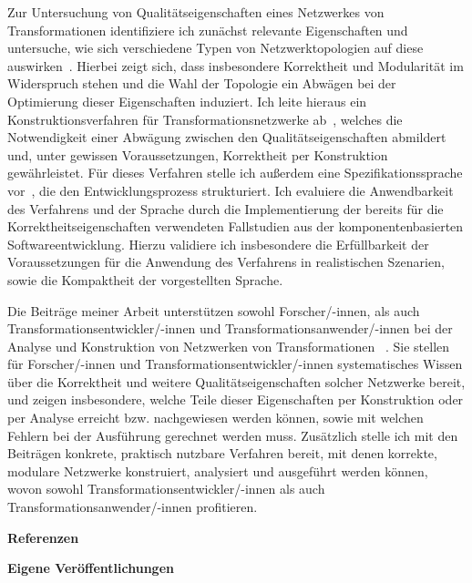 \documentclass[a4paper,deutsch,CS,11pt,unnummeriert]{KITbrief}
\newcommand\owncite[2][]{
    \cite[#1]{#2}
    \addtocategory{ownpublications}{#2}
}
\begin{document}
Zur Untersuchung von Qualitätseigenschaften eines Netzwerkes von Transformationen identifiziere ich zunächst relevante Eigenschaften und untersuche, wie sich verschiedene Typen von Netzwerktopologien auf diese auswirken~\cite{klare2018docsym}.
Hierbei zeigt sich, dass insbesondere Korrektheit und Modularität im Widerspruch stehen und die Wahl der Topologie ein Abwägen bei der Optimierung dieser Eigenschaften induziert.
Ich leite hieraus ein Konstruktionsverfahren für Transformationsnetzwerke ab~\cite{klare2019models}, welches die Notwendigkeit einer Abwägung zwischen den Qualitätseigenschaften abmildert und, unter gewissen Voraussetzungen, Korrektheit per Konstruktion gewährleistet. %
Für dieses Verfahren stelle ich außerdem eine Spezifikationssprache vor~\cite{klare2019models}, die den Entwicklungsprozess strukturiert.
Ich evaluiere die Anwendbarkeit des Verfahrens und der Sprache durch die Implementierung der bereits für die Korrektheitseigenschaften verwendeten Fallstudien aus der komponentenbasierten Softwareentwicklung. 
Hierzu validiere ich insbesondere die Erfüllbarkeit der Voraussetzungen für die Anwendung des Verfahrens in realistischen Szenarien, sowie die Kompaktheit der vorgestellten Sprache.

Die Beiträge meiner Arbeit unterstützen sowohl Forscher/-innen, als auch Transformationsentwickler/-innen und Transformationsanwender/-innen bei der Analyse und Konstruktion von Netzwerken von Transformationen~\owncite{klare2019dagstuhl}.
Sie stellen für Forscher/-innen und Transformationsentwickler/-innen systematisches Wissen über die Korrektheit und weitere Qualitätseigenschaften solcher Netzwerke bereit, und zeigen insbesondere, welche Teile dieser Eigenschaften per Konstruktion oder per Analyse erreicht bzw. nachgewiesen werden können, sowie mit welchen Fehlern bei der Ausführung gerechnet werden muss.
Zusätzlich stelle ich mit den Beiträgen konkrete, praktisch nutzbare Verfahren bereit, mit denen korrekte, modulare Netzwerke konstruiert, analysiert und ausgeführt werden können, wovon sowohl Transformationsentwickler/-innen als auch Transformationsanwender/-innen profitieren.

\clearpage
\textbf{Referenzen}
\setlength\bibitemsep{0.8ex} %
\printbibliography[title={Referenzen},heading=none,notcategory=ownpublications]

\textbf{Eigene Veröffentlichungen}
\printbibliography[title={Eigene Veröffentlichungen},heading=none,category=ownpublications]
\end{document}
